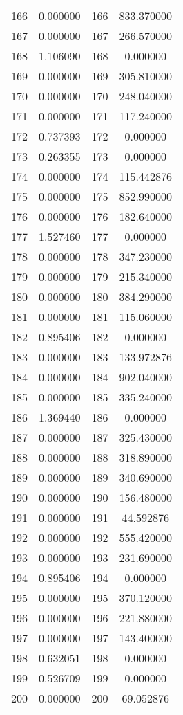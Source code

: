 \documentclass[12pt]{article}
\begin{document}
\begin{longtable}{@{}cccc@{}}
166 & 0.000000 & 166 & 833.370000 \\
167 & 0.000000 & 167 & 266.570000 \\
168 & 1.106090 & 168 & 0.000000 \\
169 & 0.000000 & 169 & 305.810000 \\
170 & 0.000000 & 170 & 248.040000 \\
171 & 0.000000 & 171 & 117.240000 \\
172 & 0.737393 & 172 & 0.000000 \\
173 & 0.263355 & 173 & 0.000000 \\
174 & 0.000000 & 174 & 115.442876 \\
175 & 0.000000 & 175 & 852.990000 \\
176 & 0.000000 & 176 & 182.640000 \\
177 & 1.527460 & 177 & 0.000000 \\
178 & 0.000000 & 178 & 347.230000 \\
179 & 0.000000 & 179 & 215.340000 \\
180 & 0.000000 & 180 & 384.290000 \\
181 & 0.000000 & 181 & 115.060000 \\
182 & 0.895406 & 182 & 0.000000 \\
183 & 0.000000 & 183 & 133.972876 \\
184 & 0.000000 & 184 & 902.040000 \\
185 & 0.000000 & 185 & 335.240000 \\
186 & 1.369440 & 186 & 0.000000 \\
187 & 0.000000 & 187 & 325.430000 \\
188 & 0.000000 & 188 & 318.890000 \\
189 & 0.000000 & 189 & 340.690000 \\
190 & 0.000000 & 190 & 156.480000 \\
191 & 0.000000 & 191 & 44.592876 \\
192 & 0.000000 & 192 & 555.420000 \\
193 & 0.000000 & 193 & 231.690000 \\
194 & 0.895406 & 194 & 0.000000 \\
195 & 0.000000 & 195 & 370.120000 \\
196 & 0.000000 & 196 & 221.880000 \\
197 & 0.000000 & 197 & 143.400000 \\
198 & 0.632051 & 198 & 0.000000 \\
199 & 0.526709 & 199 & 0.000000 \\
200 & 0.000000 & 200 & 69.052876 \\

\end{longtable}
\end{document}

